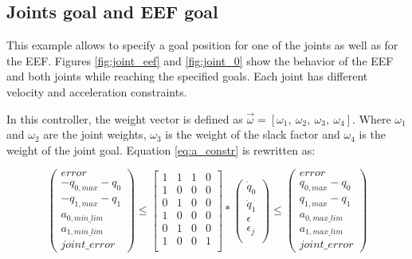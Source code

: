 \subsection{Joints goal and EEF goal}
This example allows to specify a goal position for one of the joints as well as for the EEF. Figures \ref{fig:joint_eef} and \ref{fig:joint_0} show the behavior of the EEF and both joints while reaching the specified goals. Each joint has different velocity and acceleration constraints.

In this controller, the weight vector is defined as $\vec{\omega} = [ \omega_{1},\ \omega_{2},\ \omega_{3},\ \omega_{4} ]$. Where $\omega_{1}$ and $\omega_{2}$ are the joint weights, $\omega_{3}$ is the weight of the slack factor and $\omega_{4}$ is the weight of the joint goal. Equation \ref{eq:a_constr} is rewritten as:

$$
\left( \begin{array}{c}
error \\
-q_{0,max} - q_{0} \\
-q_{1,max} - q_{1} \\
a_{0,min\_lim} \\
a_{1,min\_lim} \\
joint\_error
\end{array}
\right)	\leq 
\left[ \begin{array}{cccc}
1 & 1 & 1 & 0 \\
1 & 0 & 0 & 0 \\
0 & 1 & 0 & 0 \\
1 & 0 & 0 & 0 \\
0 & 1 & 0 & 0 \\
1 & 0 & 0 & 1 \\
\end{array}
\right] *
\left( \begin{array}{c}
\dot{q}_{0} \\
\dot{q}_{1} \\
\epsilon \\
\epsilon_j \\
\end{array}
\right) 
\leq \left( \begin{array}{c}
error \\
q_{0,max} - q_{0} \\
q_{1,max} - q_{1} \\
a_{0,max\_lim} \\
a_{1,max\_lim} \\
joint\_error
\end{array}
\right)
$$

